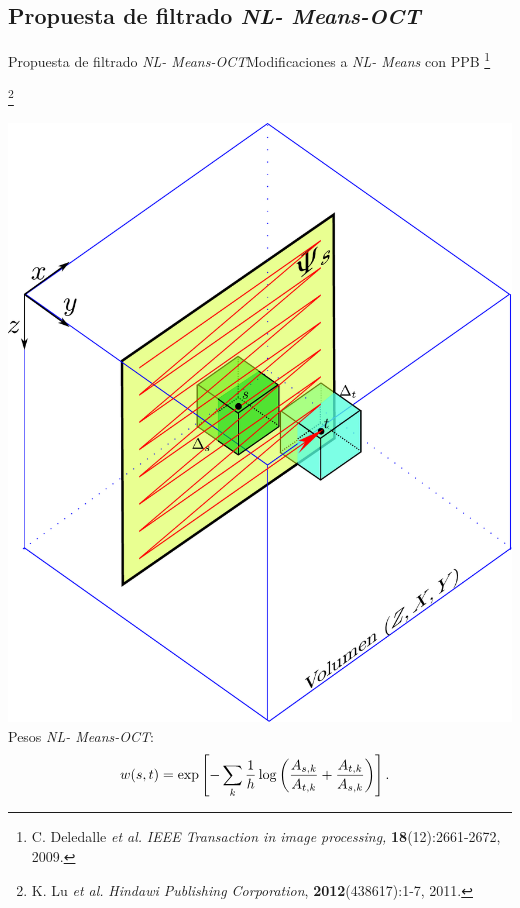 \documentclass[fleqn,10pt]{beamer}
\newcommand\blfootnote[1]{%
	\begingroup
	\renewcommand\thefootnote{}\footnote{#1}%
	\addtocounter{footnote}{-1}%
	\endgroup
}
\begin{document}
\subsection{Propuesta de filtrado \emph{NL- Means-OCT}}
\begin{frame}{Propuesta de filtrado \emph{NL- Means-OCT}}{Modificaciones a \emph{NL- Means} con PPB}
	 \blfootnote{{\tiny C. Deledalle \emph{et al.} \emph{IEEE Transaction in image processing,} \textbf{18}(12):2661-2672, 2009.}}
	  \blfootnote{{\tiny K. Lu \emph{et al.} \emph{Hindawi Publishing Corporation}, \textbf{2012}(438617):1-7, 2011.}}
	  \vspace*{-0.7cm}
	\begin{multicols}{2}
		\includegraphics[width=1\linewidth]{AAUgraphics/pt3/patches_propuesta} 
		\newpage
		\pause
		Pesos \emph{NL- Means-OCT}:
		{\scriptsize \begin{equation*}
			\hspace*{-0.25cm}w(s,t) = \exp \left[-\sum_{k} \frac{1}{h} \log \left(\frac{A_{s,k}}{A_{t,k}} + \frac{A_{t,k}}{A_{s,k}}\right) \right].

\end{equation*}}
\end{multicols}
\end{frame}
\end{document}
